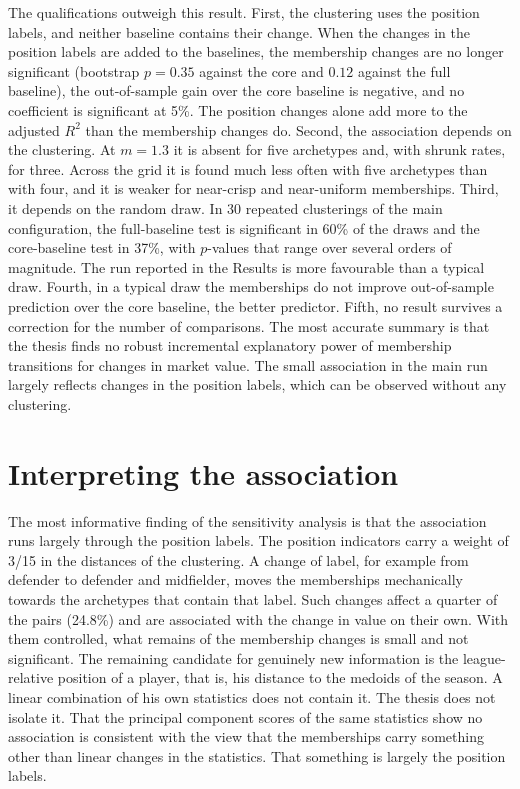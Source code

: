 The qualifications outweigh this result. First, the clustering uses the position labels, and neither baseline contains their change. When the changes in the position labels are added to the baselines, the membership changes are no longer significant (bootstrap $p=0.35$ against the core and $0.12$ against the full baseline), the out-of-sample gain over the core baseline is negative, and no coefficient is significant at 5\%. The position changes alone add more to the adjusted $R^2$ than the membership changes do. Second, the association depends on the clustering. At $m=1.3$ it is absent for five archetypes and, with shrunk rates, for three. Across the grid it is found much less often with five archetypes than with four, and it is weaker for near-crisp and near-uniform memberships. Third, it depends on the random draw. In 30 repeated clusterings of the main configuration, the full-baseline test is significant in 60\% of the draws and the core-baseline test in 37\%, with $p$-values that range over several orders of magnitude. The run reported in the Results is more favourable than a typical draw. Fourth, in a typical draw the memberships do not improve out-of-sample prediction over the core baseline, the better predictor. Fifth, no result survives a correction for the number of comparisons. The most accurate summary is that the thesis finds no robust incremental explanatory power of membership transitions for changes in market value. The small association in the main run largely reflects changes in the position labels, which can be observed without any clustering.

\section{Interpreting the association}
\label{sec:disc-fuzziness}

The most informative finding of the sensitivity analysis is that the association runs largely through the position labels. The position indicators carry a weight of 3/15 in the distances of the clustering. A change of label, for example from defender to defender and midfielder, moves the memberships mechanically towards the archetypes that contain that label. Such changes affect a quarter of the pairs (24.8\%) and are associated with the change in value on their own. With them controlled, what remains of the membership changes is small and not significant. The remaining candidate for genuinely new information is the league-relative position of a player, that is, his distance to the medoids of the season. A linear combination of his own statistics does not contain it. The thesis does not isolate it. That the principal component scores of the same statistics show no association is consistent with the view that the memberships carry something other than linear changes in the statistics. That something is largely the position labels.

